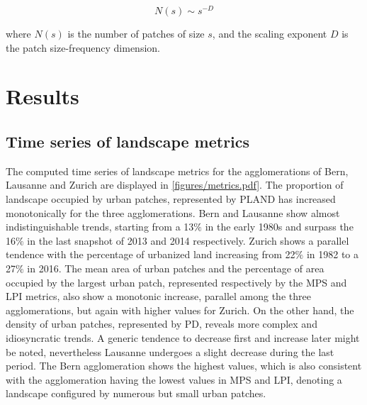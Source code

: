 \documentclass[10pt,letterpaper]{article}
\begin{document}
\begin{equation}
  \label{eq:radial-dimension}
  N(s) \sim s^{-D}
\end{equation}

where $N(s)$ is the number of patches of size $s$, and the scaling exponent $D$ is the patch size-frequency dimension.


\section*{Results}

\subsection*{Time series of landscape metrics}

The computed time series of landscape metrics for the agglomerations of Bern, Lausanne and Zurich are displayed in \autoref{figures/metrics.pdf}.
The proportion of landscape occupied by urban patches, represented by PLAND has increased monotonically for the three agglomerations. Bern and Lausanne show almost indistinguishable trends, starting from a 13$\%$ in the early 1980s and surpass the 16$\%$ in the last snapshot of 2013 and 2014 respectively. Zurich shows a parallel tendence with the percentage of urbanized land increasing from 22$\%$ in 1982 to a 27$\%$ in 2016.
The mean area of urban patches and the percentage of area occupied by the largest urban patch, represented respectively by the MPS and LPI metrics, also show a monotonic increase, parallel among the three agglomerations, but again with higher values for Zurich. %
On the other hand, the density of urban patches, represented by PD, reveals more complex and idiosyncratic trends. %
A generic tendence to decrease first and increase later might be noted, nevertheless Lausanne undergoes a slight decrease during the last period. 
The Bern agglomeration shows the highest values, which is also consistent with the agglomeration having the lowest values in MPS and LPI, denoting a landscape configured by numerous but small urban patches.
\end{document}
